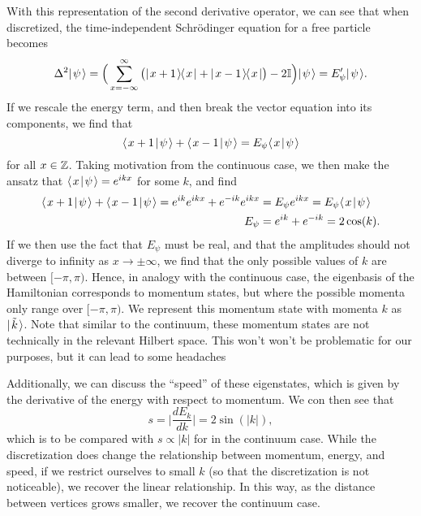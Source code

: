 \documentclass[../thesis-main/thesis-main]{subfiles}
\begin{document}
With this representation of the second derivative operator, we can see that when discretized, the time-independent Schr\"{o}dinger equation for a free particle becomes
\begin{equation}
  \Delta^2 |\mspace{2mu} \psi \mspace{2mu} \rangle = \Big(\sum_{x=-\infty}^\infty \big(|\mspace{2mu} x+1 \mspace{2mu} \rangle\mspace{-2mu}\langle\mspace{2mu} x \mspace{2mu} | + |\mspace{2mu} x-1 \mspace{2mu} \rangle\mspace{-2mu}\langle\mspace{2mu} x \mspace{2mu} |\big) - 2 \mathbb{I}\Big) |\mspace{2mu} \psi \mspace{2mu} \rangle = E'_{\psi} |\mspace{2mu} \psi \mspace{2mu} \rangle.
\end{equation}
If we rescale the energy term, and then break the vector equation into its components, we find that
\begin{equation}
  \langle\mspace{2mu} x+1 \mspace{2mu} | \mspace{2mu} \psi\mspace{2mu} \rangle + \langle\mspace{2mu} x-1 \mspace{2mu} | \mspace{2mu} \psi\mspace{2mu} \rangle = E_\psi \langle\mspace{2mu} x \mspace{2mu} | \mspace{2mu} \psi\mspace{2mu} \rangle
\end{equation}
for all $x\in \mathbb{Z}$.  Taking motivation from the continuous case,  we then make the ansatz that $\langle\mspace{2mu} x \mspace{2mu} | \mspace{2mu} \psi\mspace{2mu} \rangle = e^{i k x}$ for some $k$, and find
\begin{align}
  \langle\mspace{2mu} x+1 \mspace{2mu} | \mspace{2mu} \psi\mspace{2mu} \rangle + \langle\mspace{2mu} x-1 \mspace{2mu} | \mspace{2mu} \psi\mspace{2mu} \rangle = e^{i k } e^{i k x} + e^{-ik} e^{ikx} &= E_\psi e^{ik x} = E_\psi \langle\mspace{2mu} x \mspace{2mu} | \mspace{2mu} \psi\mspace{2mu} \rangle  \\ E_\psi &= e^{ik} + e^{-i k} = 2 \cos(k).
\end{align}
If we then use the fact that $E_\psi$ must be real, and that the amplitudes should not diverge to infinity as $x\rightarrow \pm \infty$, we find that the only possible values of $k$ are between $[-\pi,\pi)$.    Hence, in analogy with the continuous case, the eigenbasis of the Hamiltonian corresponds to momentum states, but where the possible momenta only range over $[-\pi,\pi)$.  We represent this momentum state with momenta $k$ as $|\mspace{2mu} \tilde{k} \mspace{2mu} \rangle$.  Note that similar to the continuum, these momentum states are not technically in the relevant Hilbert space.  This won't won't be problematic for our purposes, but it can lead to some headaches

Additionally, we can discuss the ``speed'' of these eigenstates, which is given by the derivative of the energy with respect to momentum.  We con then see that 
\begin{equation}
  s = \Big| \frac{d E_k}{d k} \Big| = 2 \sin (|k|),
\end{equation}
which is to be compared with $s \propto |k|$ for in the continuum case.  While the discretization does change the relationship between momentum, energy, and speed, if we restrict ourselves to small $k$ (so that the discretization is not noticeable), we recover the linear relationship.  In this way, as the distance between vertices grows smaller, we recover the continuum case.  
\end{document}
